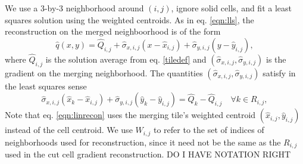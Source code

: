 \begin{enumerate}
We use a 3-by-3 neighborhood around $(i,j)$, ignore solid cells, and fit a least
squares solution using the weighted centroids.
As in eq. \eqref{eqn:lls}, the reconstruction on the merged 
neighboorhood is of the form
\begin{equation}
\widehat{q}(x,y) = \widehat{Q}_{i, j} + \widehat{\sigma}_{x,i,j}(x - \widehat{x}_{i,j}) + \widehat{\sigma}_{y,i,j}(y - \widehat{y}_{i,j}),
\end{equation}
where $\widehat{Q}_{i, j}$ is the solution average from eq. \eqref{tiledef} and $(\widehat{\sigma}_{x,i,j},\widehat{\sigma}_{y,i,j})$ is 
the gradient on the merging neighborhood.
The quantities $(\widehat{\sigma}_{x,i,j},\widehat{\sigma}_{y,i,j})$ satisfy in the least squares sense
\begin{equation}\label{eqn:linrecon}
\widehat{\sigma}_{x,i,j}(\widehat{x}_{k} - \widehat{x}_{i,j}) + \widehat{\sigma}_{y,i,j}(\widehat{y}_{k} - \widehat{y}_{i,j})= \widehat{Q}_{k} - \widehat{Q}_{i, j} \quad \forall k \in R_{i,j},
\end{equation}
Note that eq. \eqref{eqn:linrecon} uses the merging tile's weighted centroid
$(\widehat{x}_{i,j},\widehat{y}_{i,j})$ instead of the cell centroid. 
We use 
$W_{i,j}$ to refer to the set of indices of neighborhoods used for reconstruction,
since it need not be the same as the $R_{i,j}$ used in the cut cell gradient
reconstruction. DO I HAVE NOTATION RIGHT





\end{enumerate}
